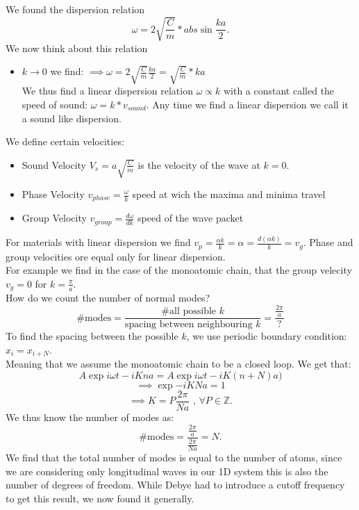 \documentclass{report}
\begin{document}
\subsection{}
We found the dispersion relation \[
	\omega = 2 \sqrt{\frac{C}{m}}  * abs{\sin{\frac{ka}{2}}}
.\] We now think about this relation
\begin{itemize}
	\item $k \to  0$ we find: $\implies \omega = 2 \sqrt{\frac{C}{m}} \frac{ka}{2} = \sqrt{\frac{C}{m}} *ka$ \\
		We thus find a linear dispersion relation $\omega \propto k$ with a constant called the speed of sound: $\omega = k * v_{sound}$. Any time we find a linear dispersion we call it a sound like dispersion. \\
\end{itemize}
We define certain velocities: 
\begin{itemize}
	\item Sound Velocity $V_s = a \sqrt{\frac{C}{m}} $ is the velocity of the wave at $k = 0$.
	\item Phase Velocity $v_{phase} = \frac{\omega}{k}$ speed at wich the maxima and minima travel 
	\item Group Velocity $v_{group} = \frac{d\omega}{dk}$ speed of the wave packet
\end{itemize}
For materials with linear dispersion we find $v_p = \frac{\alpha k}{k} = \alpha = \frac{d\left( \alpha k \right) }{k} = v_g$. Phase and group velocities ore equal only for linear dispersion. \\
For example we find in the case of the monoatomic chain, that the group velecity $v_g = 0$ for $k = \frac{\pi}{a}$. \\
How do we count the number of normal modes? \[
\text{\#modes} = \frac{\text{\#all possible }k}{\text{spacing between neighbouring }k} = \frac{\frac{2\pi}{a}}{\text{?}}
\] 
To find the spacing between the possible $k$, we use periodic boundary condition: $x_i = x_{i+N}$.\\
Meaning that we assume the monoatomic chain to be a closed loop. We get that: \[
	A \exp{i \omega t - iKna} = A \exp{i\omega t - iK\left( n+N \right) a)}
\]\[
\implies \exp{-iKNa} = 1
\]\[
\implies K = P\frac{2\pi}{Na}\text{ , } \forall P \in \mathbb{Z}
.\] We thus know the number of modes as: \[
\text{\#modes} = \frac{\frac{2\pi}{a}}{\frac{2\pi}{Na}} = N
.\] We find that the total number of modes is equal to the number of atoms, since we are considering only longitudinal waves in our 1D system this is also the number of degrees of freedom. While Debye had to introduce a cutoff frequency to get this result, we now found it generally.
\end{document}
